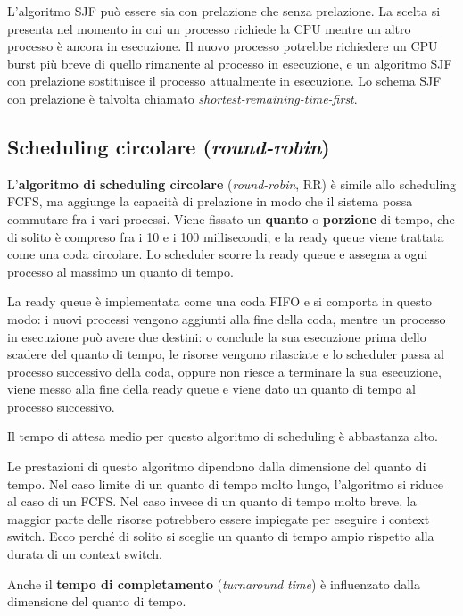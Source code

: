         L'algoritmo SJF può essere sia con prelazione che senza prelazione. La scelta si presenta nel momento in cui un processo richiede la CPU mentre un altro processo è ancora in esecuzione. Il nuovo processo potrebbe richiedere un CPU burst più breve di quello rimanente al processo in esecuzione, e un algoritmo SJF con prelazione sostituisce il processo attualmente in esecuzione. Lo schema SJF con prelazione è talvolta chiamato \textit{shortest-remaining-time-first}.
        
    \subsection{Scheduling circolare (\textit{round-robin})}
        L'\textbf{algoritmo di scheduling circolare} (\textit{round-robin}, RR) è simile allo scheduling FCFS, ma aggiunge la capacità di prelazione in modo che il sistema possa commutare fra i vari processi. Viene fissato un \textbf{quanto} o \textbf{porzione} di tempo, che di solito è compreso fra i 10 e i 100 millisecondi, e la ready queue viene trattata come una coda circolare. Lo scheduler scorre la ready queue e assegna a ogni processo al massimo un quanto di tempo.
        
        La ready queue è implementata come una coda FIFO e si comporta in questo modo: i nuovi processi vengono aggiunti alla fine della coda, mentre un processo in esecuzione può avere due destini: o conclude la sua esecuzione prima dello scadere del quanto di tempo, le risorse vengono rilasciate e lo scheduler passa al processo successivo della coda, oppure non riesce a terminare la sua esecuzione, viene messo alla fine della ready queue e viene dato un quanto di tempo al processo successivo.
        
        Il tempo di attesa medio per questo algoritmo di scheduling è abbastanza alto.
        
        Le prestazioni di questo algoritmo dipendono dalla dimensione del quanto di tempo. Nel caso limite di un quanto di tempo molto lungo, l'algoritmo si riduce al caso di un FCFS. Nel caso invece di un quanto di tempo molto breve, la maggior parte delle risorse potrebbero essere impiegate per eseguire i context switch. Ecco perché di solito si sceglie un quanto di tempo ampio rispetto alla durata di un context switch.
        
        Anche il \textbf{tempo di completamento} (\textit{turnaround time}) è influenzato dalla dimensione del quanto di tempo.
        
